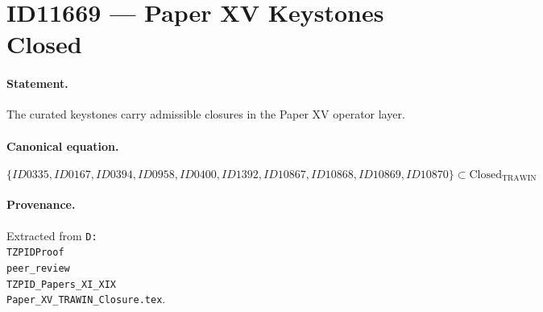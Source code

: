 \section*{ID11669 --- Paper XV Keystones Closed}

\paragraph{Statement.}
The curated keystones carry admissible closures in the Paper XV operator layer.

\paragraph{Canonical equation.}
\[
\{ID0335,ID0167,ID0394,ID0958,ID0400,ID1392,ID10867,ID10868,ID10869,ID10870\}\subset\mathrm{Closed}_{\mathrm{TRAWIN}}
\]

\paragraph{Provenance.}
Extracted from \texttt{D:\\TZPIDProof\\peer\_review\\TZPID\_Papers\_XI\_XIX\\Paper\_XV\_TRAWIN\_Closure.tex}.

